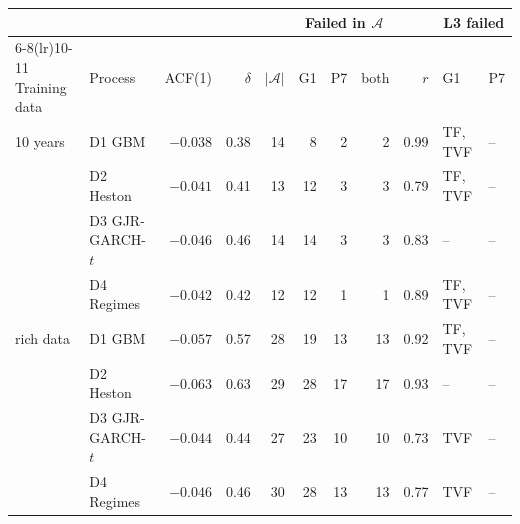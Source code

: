 \begin{tabular}{llrrrrrrrll}
\toprule
& & & & & \multicolumn{3}{c}{Failed in $\mathcal{A}$} & & \multicolumn{2}{c}{L3 failed} \\
\cmidrule(lr){6-8}\cmidrule(lr){10-11}
Training data & Process & ACF(1) & $\delta$ & $|\mathcal{A}|$ & G1 & P7 & both & $r$ & G1 & P7 \\
\midrule
10 years & D1 GBM & $-0.038$ & 0.38 & 14 & 8 & 2 & 2 & 0.99 & TF, TVF & -- \\
 & D2 Heston & $-0.041$ & 0.41 & 13 & 12 & 3 & 3 & 0.79 & TF, TVF & -- \\
 & D3 GJR-GARCH-$t$ & $-0.046$ & 0.46 & 14 & 14 & 3 & 3 & 0.83 & -- & -- \\
 & D4 Regimes & $-0.042$ & 0.42 & 12 & 12 & 1 & 1 & 0.89 & TF, TVF & -- \\
\addlinespace
rich data & D1 GBM & $-0.057$ & 0.57 & 28 & 19 & 13 & 13 & 0.92 & TF, TVF & -- \\
 & D2 Heston & $-0.063$ & 0.63 & 29 & 28 & 17 & 17 & 0.93 & -- & -- \\
 & D3 GJR-GARCH-$t$ & $-0.044$ & 0.44 & 27 & 23 & 10 & 10 & 0.73 & TVF & -- \\
 & D4 Regimes & $-0.046$ & 0.46 & 30 & 28 & 13 & 13 & 0.77 & TVF & -- \\
\bottomrule
\end{tabular}
